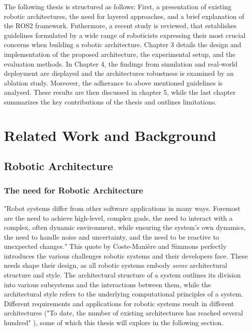 \documentclass[%
paper=A4,               %
twoside=true,           %
openright,              %
11pt,                   %
bibliography=totoc,     %
titlepage=on,           %
DIV=12,                 %
BCOR=1.5cm,             %
parskip=half,            %
final
]{scrreprt}
\begin{document}
	The following thesis is structured as follows: First, a presentation of existing robotic architectures, the need for layered approaches, and a brief explanation of the ROS2 framework. Futhermore, a recent study is reviewed, that establishes guidelines formulated by a wide range of roboticists expressing their most crucial concerns when building a robotic architecture. Chapter 3 details the design and implementation of the proposed architecture, the experimental setup, and the evaluation methods. In Chapter 4, the findings from simulation and real-world deployment are displayed and the architectures robustness is examined by an ablation study. Moreover,  the adherance to above mentioned guidelines is analysed. These results are then discussed in chapter 5, while the last chapter summarizes the key contributions of the thesis and outlines limitations.
	
	
	\chapter{Related Work and Background}
	\section{Robotic Architecture}
	\subsection{The need for Robotic Architecture}
	"Robot systems differ from other software applications in many ways. Foremost are the need to achieve high-level, complex goals, the need to interact with a complex, often dynamic environment, while ensuring the system’s own dynamics, the need to handle noise and uncertainty, and the need to be reactive to unexpected changes." \autocite{coste-maniereArchitectureBackboneRobotic2000} This quote by Coste-Mani\`{e}re and Simmons perfectly introduces the various challenges robotic systems and their developers face. These needs shape their design, as all robotic systems embody \textit{some} architectural structure and style. The architectural structure of a system outlines its division into various subsystems and the interactions between them, while the architectural style refers to the underlying computational principles of a system. \autocite{coste-maniereArchitectureBackboneRobotic2000} Different requirements and applications for robotic systems result in different architectures ("To date, the number of existing architectures has reached several hundred" \autocite{kotseruba40YearsCognitive2020}), some of which this thesis will explore in the following section.
	
\end{document}
